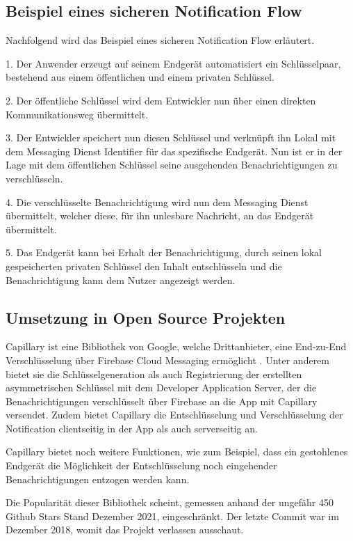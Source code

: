 \documentclass[sigconf]{acmart}
\begin{document}
\subsection{Beispiel eines sicheren Notification Flow}
Nachfolgend wird das Beispiel eines sicheren Notification Flow erläutert.

1. Der Anwender erzeugt auf seinem Endgerät automatisiert ein 
Schlüsselpaar, bestehend aus einem öffentlichen und einem privaten 
Schlüssel.

2. Der öffentliche Schlüssel wird dem Entwickler nun über einen direkten 
Kommunikationsweg übermittelt.

3. Der Entwickler speichert nun diesen Schlüssel und verknüpft ihn Lokal 
mit dem Messaging Dienst Identifier für das spezifische Endgerät. 
Nun ist er in der Lage mit dem öffentlichen Schlüssel seine ausgehenden 
Benachrichtigungen zu verschlüsseln.

4. Die verschlüsselte Benachrichtigung wird nun dem Messaging Dienst 
übermittelt, welcher diese, für ihn unlesbare Nachricht, an das Endgerät 
übermittelt.

5. Das Endgerät kann bei Erhalt der Benachrichtigung, durch seinen lokal 
gespeicherten privaten Schlüssel den Inhalt entschlüsseln und die 
Benachrichtigung kann dem Nutzer angezeigt werden.

\subsection{Umsetzung in Open Source Projekten}

Capillary ist eine Bibliothek von Google, welche Drittanbieter, eine End-zu-End 
Verschlüsselung über Firebase Cloud Messaging ermöglicht \cite{capillary}. Unter anderem 
bietet sie die Schlüsselgeneration als auch Registrierung der erstellten 
asymmetrischen Schlüssel mit dem Developer Application Server, der die 
Benachrichtigungen verschlüsselt über Firebase an die App mit Capillary 
versendet. Zudem bietet Capillary die Entschlüsselung und Verschlüsselung 
der Notification clientseitig in der App als auch serverseitig an.

Capillary bietet noch weitere Funktionen, wie zum Beispiel, dass ein gestohlenes 
Endgerät die Möglichkeit der Entschlüsselung noch eingehender Benachrichtigungen 
entzogen werden kann.

Die Popularität dieser Bibliothek scheint, gemessen anhand der ungefähr 
450 Github Stars Stand Dezember 2021, eingeschränkt. Der letzte Commit 
war im Dezember 2018, womit das Projekt verlassen ausschaut.
\end{document}
